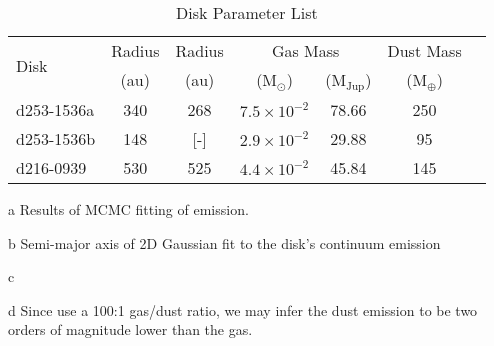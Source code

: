 \begin{table}[ht!]
  \centering
  \begin{threeparttable}
    \caption{Disk Parameter List}
    \label{table:disk_masses_rads}
    \renewcommand{\arraystretch}{1.2}
    \begin{tabular}{l c c c c c c}
      \toprule \toprule
      \multirow{2}{*}{Disk}  & Radius\tnote{a} & Radius\tnote{b} & \multicolumn{2}{c}{Gas Mass\tnote{c}} &  Dust Mass\tnote{d} \\
                             & (au)            & (au)            & (M$_\odot$)       & (M$_\text{Jup}$)  & (M$_\oplus$)  \\
      \midrule %
      d253-1536a             & 340             & 268             & $7.5 \times 10^{-2}$        & 78.66   & 250   \\
      d253-1536b             & 148             & [-]             & $2.9 \times 10^{-2}$        & 29.88   & 95     \\
      d216-0939              & 530             & 525             & $4.4 \times 10^{-2}$        & 45.84   & 145   \\
      \bottomrule
    \end{tabular}
    \begin{tablenotes}\footnotesize
      \item[a] Results of MCMC fitting of \hco emission.
      \item[b] Semi-major axis of 2D Gaussian fit to the disk's continuum emission \citep{Mann2014}
      \item[c] \citet{Williams2014}
      \item[d] Since \citet{Williams2014} use a 100:1 gas/dust ratio, we may infer the dust emission to be two orders of magnitude lower than the gas.
    \end{tablenotes}
  \end{threeparttable}
\end{table}



